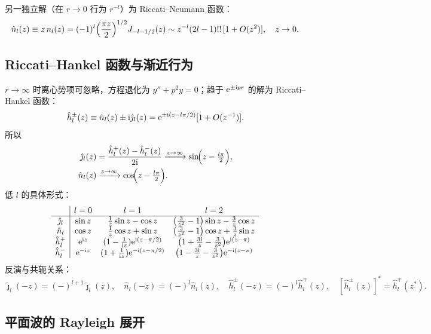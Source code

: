 另一独立解（在 $r\to0$ 行为 $r^{-l}$）为 Riccati--Neumann 函数：
\begin{equation}\label{eq:RNeumann}
\hat n_l(z)\equiv z\,n_l(z)
= (-1)^l\Bigl(\frac{\pi z}{2}\Bigr)^{1/2}J_{-l-1/2}(z)
\sim z^{-l}(2l-1)!!\,[1+O(z^2)],\quad z\to 0.
\end{equation}

\subsection{Riccati--Hankel 函数与渐近行为}

$r\to\infty$ 时离心势项可忽略，方程退化为
$y''+p^2 y=0$；趋于 $\mathrm{e}^{\pm\mathrm{i} pr}$ 的解为 Riccati--Hankel
函数：
\begin{equation}\label{eq:RHankel}
\hat h_l^\pm(z)\equiv \hat n_l(z)\pm\mathrm{i}\hat\jmath_l(z)
= \mathrm{e}^{\pm\mathrm{i}(z-l\pi/2)}[1+O(z^{-1})].
\end{equation}
所以
\begin{align}
\hat\jmath_l(z) &= \frac{\hat h_l^+(z)-\hat h_l^-(z)}{2\mathrm{i}}
\xrightarrow{z\to\infty} \sin\!\Bigl(z-\tfrac{l\pi}{2}\Bigr),\label{eq:jhat-asy}\\
\hat n_l(z) &\xrightarrow{z\to\infty} \cos\!\Bigl(z-\tfrac{l\pi}{2}\Bigr).
\end{align}
低 $l$ 的具体形式：
\[
\begin{array}{c|ccc}
 & l=0 & l=1 & l=2\\\hline
\hat\jmath_l & \sin z & \frac{1}{z}\sin z-\cos z &
   \bigl(\frac{3}{z^2}-1\bigr)\sin z-\frac{3}{z}\cos z\\
\hat n_l & \cos z & \frac{1}{z}\cos z+\sin z &
   \bigl(\frac{3}{z^2}-1\bigr)\cos z+\frac{3}{z}\sin z\\
\hat h_l^+ & \mathrm{e}^{\mathrm{i} z} & (1-\frac{1}{\mathrm{i} z})\mathrm{e}^{\mathrm{i}(z-\pi/2)} &
   \bigl(1+\frac{3\mathrm{i}}{z}-\frac{3}{z^2}\bigr)\mathrm{e}^{\mathrm{i}(z-\pi)}\\
\hat h_l^- & \mathrm{e}^{-\mathrm{i} z} & (1+\frac{1}{\mathrm{i} z})\mathrm{e}^{-\mathrm{i}(z-\pi/2)} &
   \bigl(1-\frac{3\mathrm{i}}{z}-\frac{3}{z^2}\bigr)\mathrm{e}^{-\mathrm{i}(z-\pi)}
\end{array}
\]
反演与共轭关系：
\begin{equation}
\hat\jmath_l(-z)=(-)^{l+1}\hat\jmath_l(z),\quad
\hat n_l(-z)=(-)^l\hat n_l(z),\quad
\hat h_l^\pm(-z)=(-)^l\hat h_l^\mp(z),\quad
[\hat h_l^\pm(z)]^*=\hat h_l^\mp(z^*).
\end{equation}

\subsection{平面波的 Rayleigh 展开}

